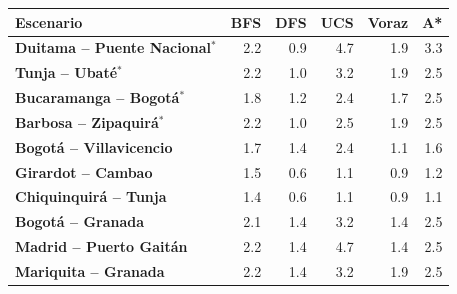 \renewcommand{\arraystretch}{1.2}
\begin{tabular}{|l|r|r|r|r|r|}
\hline
\rowcolor{gray!20} \textbf{Escenario} & \textbf{BFS} & \textbf{DFS} & \textbf{UCS} & \textbf{Voraz} & \textbf{A*} \\
\hline
\textbf{Duitama -- Puente Nacional$^{*}$} & 2.2 & 0.9 & 4.7 & 1.9 & 3.3 \\
\hline
\textbf{Tunja -- Ubaté$^{*}$} & 2.2 & 1.0 & 3.2 & 1.9 & 2.5 \\
\hline
\textbf{Bucaramanga -- Bogotá$^{*}$} & 1.8 & 1.2 & 2.4 & 1.7 & 2.5 \\
\hline
\textbf{Barbosa -- Zipaquirá$^{*}$} & 2.2 & 1.0 & 2.5 & 1.9 & 2.5 \\
\hline
\textbf{Bogotá -- Villavicencio} & 1.7 & 1.4 & 2.4 & 1.1 & 1.6 \\
\hline
\textbf{Girardot -- Cambao} & 1.5 & 0.6 & 1.1 & 0.9 & 1.2 \\
\hline
\textbf{Chiquinquirá -- Tunja} & 1.4 & 0.6 & 1.1 & 0.9 & 1.1 \\
\hline
\textbf{Bogotá -- Granada} & 2.1 & 1.4 & 3.2 & 1.4 & 2.5 \\
\hline
\textbf{Madrid -- Puerto Gaitán} & 2.2 & 1.4 & 4.7 & 1.4 & 2.5 \\
\hline
\textbf{Mariquita -- Granada} & 2.2 & 1.4 & 3.2 & 1.9 & 2.5 \\
\hline
\end{tabular}
